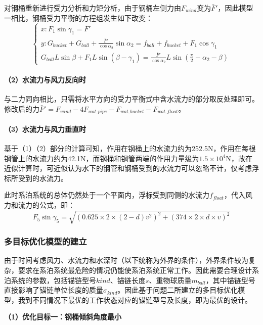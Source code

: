 \documentclass[withoutpreface,bwprint]{cumcmthesis}
\begin{document}
对钢桶重新进行受力分析和力矩分析，由于钢桶左侧力由$F_{wind}$变为$\bar{F}'$，因此模型一相比，钢桶受力平衡的方程组发生如下改变：
\begin{equation}
\begin{cases}
x: F_1\sin\gamma_1 = \bar{F}' \\
y: G_{bucket} + G_{ball} + \frac{\bar{F}'}{\cos\alpha_2}\sin\alpha_2 = f_{ball} + f_{bucket} + F_1\cos\gamma_1 \\
G_{ball}L\sin\beta + F_1L\sin(\beta-\gamma_1) = \frac{\bar{F}'}{\cos\alpha_2}L\sin\left(\frac{\pi}{2}-\alpha_2-\beta\right)
\end{cases}
\end{equation}

\paragraph{（2）水流力与风力反向时}
与二力同向相比，只需将水平方向的受力平衡式中含水流力的部分取反处理即可。修改后的力$\bar{F}' = F_{wind} - 4F_{wat\_pipe} - F_{wat\_bucket} - F_{wat\_float}$。

\paragraph{（3）水流力与风力垂直时}
基于（1）（2）部分的计算可知，作用在钢桶上的水流力约为252.5N，作用在每根钢管上的水流力约为42.1N，而钢桶和钢管两端的作用力量级为$1.5 \times 10^4$N，故在近似计算时，可近似认为水下的钢管和钢桶受到的水流力可以忽略不计，仅考虑浮标所受到的水流力。

此时系泊系统的总体仍然处于一个平面内，浮标受到同侧的水流力$f_{float}$，代入风力和流力的公式，即：
\begin{equation}
F_5\sin\gamma_5 = \sqrt{(0.625 \times 2 \times (2-d)v^2)^2 + (374 \times 2 \times d \times v)^2}
\end{equation}

\subsubsection{多目标优化模型的建立}
由于时间考虑风力、水流力和水深时（以下统称为外界的条件），外界条件较为复杂，要求在系泊系统最危险的情况仍能使系泊系统正常工作。因此需要合理设计系泊系统的参数，包括锚链型号$kind$、锚链长度$s$、重物球质量$m_{ball}$，其中锚链型号直接影响了锚链单位长度的质量$\sigma_{kind}$。因此基于问题二所建立的多目标优化模型，我到不同情况下最优的工作状态对应的锚链型号及长度，即为最优的设计。

\textbf{（1）优化目标一：钢桶倾斜角度最小}
\end{document}

